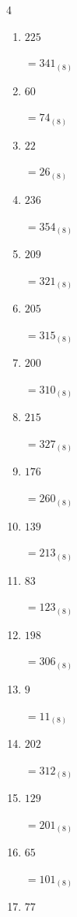 \begin{multicols}{4}
\begin{enumerate}
  \item $225$

        $=341_{(8)}$

  \item $60$

        $=74_{(8)}$

  \item $22$

        $=26_{(8)}$

  \item $236$

        $=354_{(8)}$

  \item $209$

        $=321_{(8)}$

  \item $205$

        $=315_{(8)}$

  \item $200$

        $=310_{(8)}$

  \item $215$

        $=327_{(8)}$

\columnbreak %

  \item $176$

        $=260_{(8)}$

  \item $139$

        $=213_{(8)}$

  \item $83$

        $=123_{(8)}$

  \item $198$

        $=306_{(8)}$

  \item $9$

        $=11_{(8)}$

  \item $202$

        $=312_{(8)}$

  \item $129$

        $=201_{(8)}$

  \item $65$

        $=101_{(8)}$

  \item $77$


\end{enumerate}
\end{multicols}
